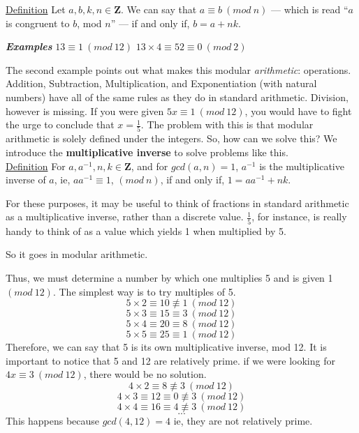\documentclass{article}
\begin{document}
	        \noindent\underline{Definition} Let $a,b,k,n\in\mathbf{Z}$.  
	        We can say that $a\equiv b\ (mod\ n)$ --- which is read ``$a$ is congruent to $b$, mod $n$'' --- if and only if, $b=a+nk$.  
	        
	        \textbf{\textit{Examples}}
	        \hspace*{\fill}
		        {$13\equiv 1\ (mod\ 12)$} \hfill {$13\times4\equiv 52\equiv 0\ (mod\ 2)$}
	        \hspace*{\fill}
	        
	        The second example points out what makes this modular \textit{arithmetic}: operations.  Addition, Subtraction, Multiplication, and Exponentiation (with natural numbers) have all of the same rules as they do in standard arithmetic.  
	        Division, however is missing.  If you were given $5x\equiv 1\ (mod\ 12)$, you would have to fight the urge to conclude that $x=\frac{1}{5}$.  
	        The problem with this is that modular arithmetic is solely defined under the integers.  
	        So, how can we solve this?  We introduce the \textbf{multiplicative inverse} to solve problems like this.\\
	        \underline{Definition} For $a, a^{-1}, n, k \in\mathbf{Z}$, and for $gcd(a,n)=1$, $a^{-1}$ is the multiplicative inverse of $a$, ie, $aa^{-1}\equiv1$, $(mod\ n)$, if and only if, $1=aa^{-1}+nk$.
	        
            For these purposes, it may be useful to think of fractions in standard arithmetic as a multiplicative inverse, rather than a discrete value.  
	        $\frac{1}{5}$, for instance, is really handy to think of as a value which yields 1 when multiplied by 5.  
	        
	        So it goes in modular arithmetic.  
	        
	        Thus, we must determine a number by which one multiplies 5 and is given 1 $(mod\ 12)$.
	        The simplest way is to try multiples of 5.
	        $$5\times 2\equiv 10\not \equiv 1\ (mod\ 12)$$
	        $$5\times 3\equiv 15\equiv 3\ (mod\ 12)$$
	        $$5\times 4\equiv 20\equiv 8\ (mod\ 12)$$
	        $$5\times 5\equiv 25\equiv 1\ (mod\ 12)$$
	        Therefore, we can say that 5 is its own multiplicative inverse, mod 12.  
	        It is important to notice that 5 and 12 are relatively prime.  
	        if we were looking for $4x\equiv 3\ (mod\ 12)$, there would be no solution.
	        $$4\times2 \equiv 8 \not\equiv 3\ (mod\ 12)$$
	        $$4\times3 \equiv12 \equiv0 \not\equiv 3\ (mod\ 12)$$
	        $$4\times4 \equiv 16 \equiv4 \not\equiv 3\ (mod\ 12)$$
	        $$...$$
	        This happens because $gcd(4,12)=4$ ie, they are not relatively prime.
            
\end{document}
